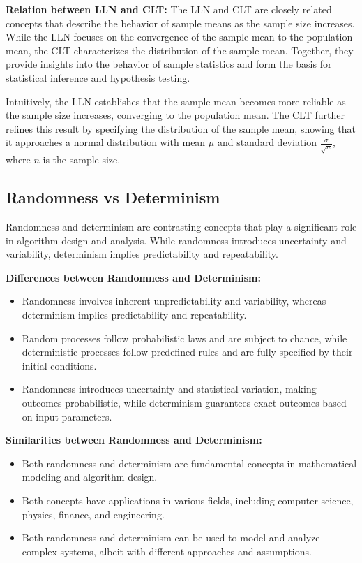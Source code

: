\documentclass[12pt]{book} %
\begin{document}
\textbf{Relation between LLN and CLT:} The LLN and CLT are closely related concepts that describe the behavior of sample means as the sample size increases. While the LLN focuses on the convergence of the sample mean to the population mean, the CLT characterizes the distribution of the sample mean. Together, they provide insights into the behavior of sample statistics and form the basis for statistical inference and hypothesis testing.

Intuitively, the LLN establishes that the sample mean becomes more reliable as the sample size increases, converging to the population mean. The CLT further refines this result by specifying the distribution of the sample mean, showing that it approaches a normal distribution with mean \(\mu\) and standard deviation \(\frac{\sigma}{\sqrt{n}}\), where \(n\) is the sample size.

\subsection{Randomness vs Determinism}
Randomness and determinism are contrasting concepts that play a significant role in algorithm design and analysis. While randomness introduces uncertainty and variability, determinism implies predictability and repeatability.

\textbf{Differences between Randomness and Determinism:}
\begin{itemize}
    \item Randomness involves inherent unpredictability and variability, whereas determinism implies predictability and repeatability.
    \item Random processes follow probabilistic laws and are subject to chance, while deterministic processes follow predefined rules and are fully specified by their initial conditions.
    \item Randomness introduces uncertainty and statistical variation, making outcomes probabilistic, while determinism guarantees exact outcomes based on input parameters.
\end{itemize}

\textbf{Similarities between Randomness and Determinism:}
\begin{itemize}
    \item Both randomness and determinism are fundamental concepts in mathematical modeling and algorithm design.
    \item Both concepts have applications in various fields, including computer science, physics, finance, and engineering.
    \item Both randomness and determinism can be used to model and analyze complex systems, albeit with different approaches and assumptions.
\end{itemize}
\end{document}
